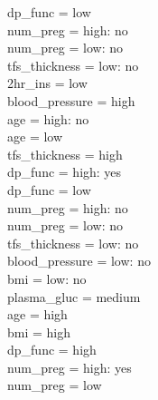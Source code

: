 \documentclass[12pt]{article}
\begin{document}
\textbar\quad \textbar\quad \textbar\quad \textbar\quad \textbar\quad \textbar\quad dp\_func = low\\
\textbar\quad \textbar\quad \textbar\quad \textbar\quad \textbar\quad \textbar\quad \textbar\quad num\_preg = high: no\\
\textbar\quad \textbar\quad \textbar\quad \textbar\quad \textbar\quad \textbar\quad \textbar\quad num\_preg = low: no\\
\textbar\quad \textbar\quad \textbar\quad \textbar\quad \textbar\quad tfs\_thickness = low: no\\
\textbar\quad \textbar\quad 2hr\_ins = low\\
\textbar\quad \textbar\quad \textbar\quad blood\_pressure = high\\
\textbar\quad \textbar\quad \textbar\quad \textbar\quad age = high: no\\
\textbar\quad \textbar\quad \textbar\quad \textbar\quad age = low\\
\textbar\quad \textbar\quad \textbar\quad \textbar\quad \textbar\quad tfs\_thickness = high\\
\textbar\quad \textbar\quad \textbar\quad \textbar\quad \textbar\quad \textbar\quad dp\_func = high: yes\\
\textbar\quad \textbar\quad \textbar\quad \textbar\quad \textbar\quad \textbar\quad dp\_func = low\\
\textbar\quad \textbar\quad \textbar\quad \textbar\quad \textbar\quad \textbar\quad \textbar\quad num\_preg = high: no\\
\textbar\quad \textbar\quad \textbar\quad \textbar\quad \textbar\quad \textbar\quad \textbar\quad num\_preg = low: no\\
\textbar\quad \textbar\quad \textbar\quad \textbar\quad \textbar\quad tfs\_thickness = low: no\\
\textbar\quad \textbar\quad \textbar\quad blood\_pressure = low: no\\
\textbar\quad bmi = low: no\\
plasma\_gluc = medium\\
\textbar\quad age = high\\
\textbar\quad \textbar\quad bmi = high\\
\textbar\quad \textbar\quad \textbar\quad dp\_func = high\\
\textbar\quad \textbar\quad \textbar\quad \textbar\quad num\_preg = high: yes\\
\textbar\quad \textbar\quad \textbar\quad \textbar\quad num\_preg = low\\
\end{document}
